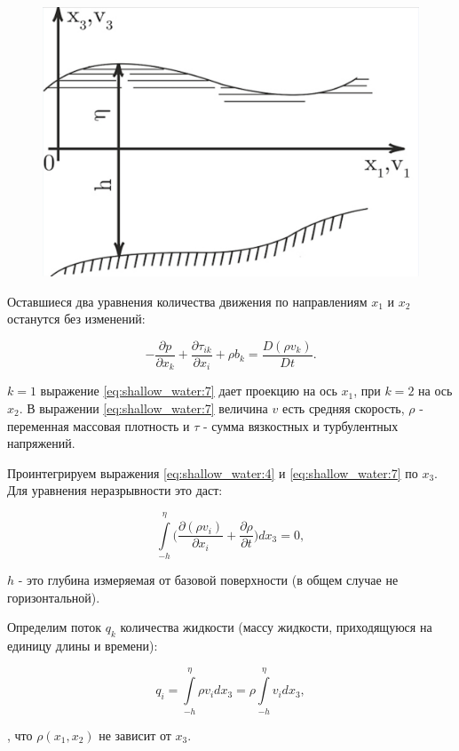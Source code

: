 \documentclass[14pt]{extreport}
\begin{document}
\begin{figure}[H]
\centerline{\includegraphics[width=0.5\linewidth]{images/shallow_water_1}}
\caption{}
\label{img:shallow_water:1}
\end{figure}


Оставшиеся два уравнения количества движения по направлениям $x_1$ и $x_2$ останутся без изменений:

\begin{equation}\label{eq:shallow_water:7}
-\frac{\partial p}{\partial x_k} + \frac{\partial \tau_{ik}}{\partial x_i} + \rho b_k = \frac{D(\rho v_k)}{Dt}.
\end{equation}

 $k=1$ выражение \ref{eq:shallow_water:7} дает проекцию на ось $x_1$, при $k=2$ на ось $x_2$. В выражении \ref{eq:shallow_water:7} величина $v$ есть средняя скорость, $\rho$ - переменная массовая плотность и $\tau$ - сумма вязкостных и турбулентных напряжений.

Проинтегрируем выражения \ref{eq:shallow_water:4} и \ref{eq:shallow_water:7} по $x_3$. Для уравнения неразрывности это даст:

\begin{equation}\label{eq:shallow_water:8}
\int\limits^\eta_{-h} \bigg(\frac{\partial (\rho v_i)}{\partial x_i} + \frac{\partial \rho}{\partial t}\bigg) dx_3 =0,
\end{equation}

 $h$ - это глубина измеряемая от базовой поверхности (в общем случае не горизонтальной).

Определим поток $q_k$ количества жидкости (массу жидкости, приходящуюся на единицу длины и времени):


\begin{equation}\label{eq:shallow_water:9}
q_i = \int\limits^\eta_{-h} \rho v_i dx_3 = \rho \int\limits^\eta_{-h} v_i dx_3,
\end{equation}

, что $\rho(x_1, x_2)$ не зависит от $x_3$.
\end{document}
